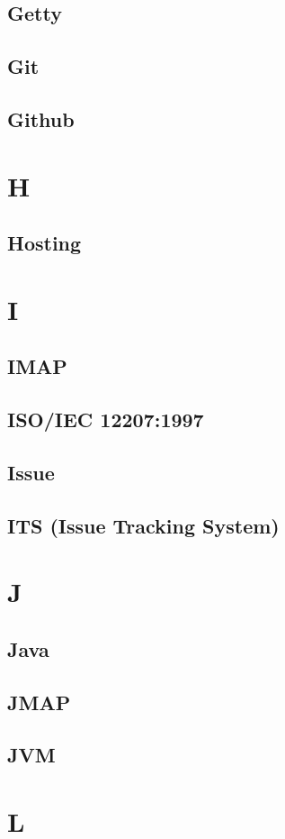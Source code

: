 \documentclass[12pt]{article}
\begin{document}
		\subsection{Getty}
		\subsection{Git}
		\subsection{Github}
	\clearpage
	\section{H}
		\subsection{Hosting}
	\clearpage
	\section{I}
		\subsection{IMAP}
		\subsection{ISO/IEC 12207:1997}
		\subsection{Issue}
		\subsection{ITS (Issue Tracking System)}
	\clearpage
	\section{J}
		\subsection{Java}
		\subsection{JMAP}
		\subsection{JVM}
	\clearpage
	\section{L}
\end{document}

